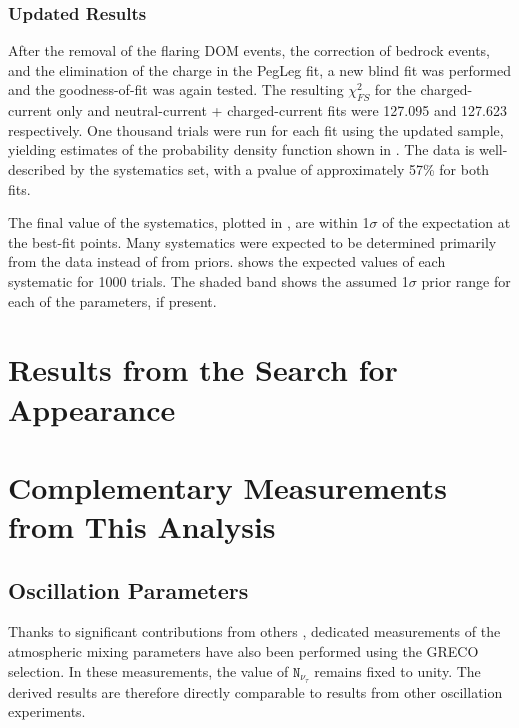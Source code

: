 
\label{subsubsec:final_blind_fits}
\subsubsection{Updated Results}
After the removal of the flaring DOM events, the correction of bedrock events, and the elimination of the charge in the PegLeg fit, a new blind fit was performed and the goodness-of-fit was again tested.
The resulting $\chi^2_{FS}$ for the charged-current only and neutral-current + charged-current fits were 127.095 and 127.623 respectively.
One thousand trials were run for each fit using the updated sample, yielding estimates of the probability density function shown in .
The data is well-described by the systematics set, with a pvalue of approximately 57\% for both fits.

The final value of the systematics, plotted in , are within 1$\mathtt{\sigma}$ of the expectation at the best-fit points.
Many systematics were expected to be determined primarily from the data instead of from priors. 
 shows the expected values of each systematic for 1000 trials.
The shaded band shows the assumed 1$\mathtt{\sigma}$ prior range for each of the parameters, if present.



\label{section:tau_results}
\section{Results from the Search for Appearance}


\label{section:other_measurements}
\section{Complementary Measurements from This Analysis}

\label{subsec:oscil_results}
\subsection{Oscillation Parameters}
Thanks to significant contributions from others , dedicated measurements of the atmospheric mixing parameters have also been performed using the GRECO selection.
In these measurements, the value of $\mathtt{N_{\nu_\tau}}$ remains fixed to unity.
The derived results are therefore directly comparable to results from other oscillation experiments.

